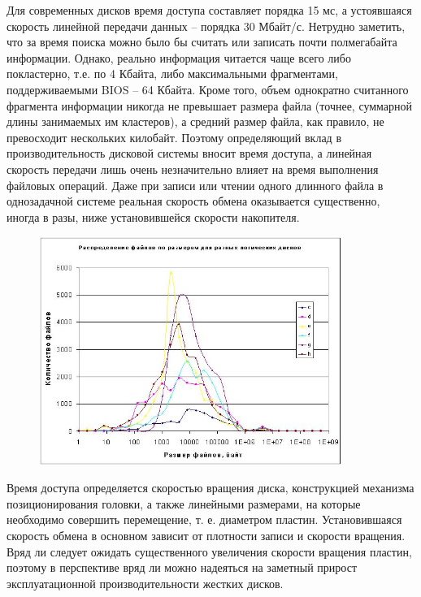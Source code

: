 \documentclass[bachelor, och, referat]{SCWorks}
\begin{document}
Для современных дисков время доступа составляет порядка 15 мс, а устоявшаяся скорость линейной передачи данных -- порядка 30 Мбайт/с. Нетрудно заметить, что за время поиска можно было бы считать или записать почти полмегабайта информации. Однако, реально информация читается чаще всего либо покластерно, т.е. по 4 Кбайта, либо максимальными фрагментами, поддерживаемыми BIOS -- 64 Кбайта. Кроме того, объем однократно считанного фрагмента информации никогда не превышает размера файла (точнее, суммарной длины занимаемых им кластеров), а средний размер файла, как правило, не превосходит нескольких килобайт. Поэтому определяющий вклад в производительность дисковой системы вносит время доступа, а линейная скорость передачи лишь очень незначительно влияет на время выполнения файловых операций. Даже при записи или чтении одного длинного файла в однозадачной системе реальная скорость обмена оказывается существенно, иногда в разы, ниже установившейся скорости накопителя.

\begin{figure}[H]
    \centering
    \includegraphics[width=0.88\textwidth]{graph3.png}
    \caption{}
    \label{}
\end{figure}

Время доступа определяется скоростью вращения диска, конструкцией механизма позиционирования головки, а также линейными размерами, на которые необходимо совершить перемещение, т. е. диаметром пластин. Установившаяся скорость обмена в основном зависит от плотности записи и скорости вращения. Вряд ли следует ожидать существенного увеличения скорости вращения пластин, поэтому в перспективе вряд ли можно надеяться на заметный прирост эксплуатационной производительности жестких дисков.
\end{document}
